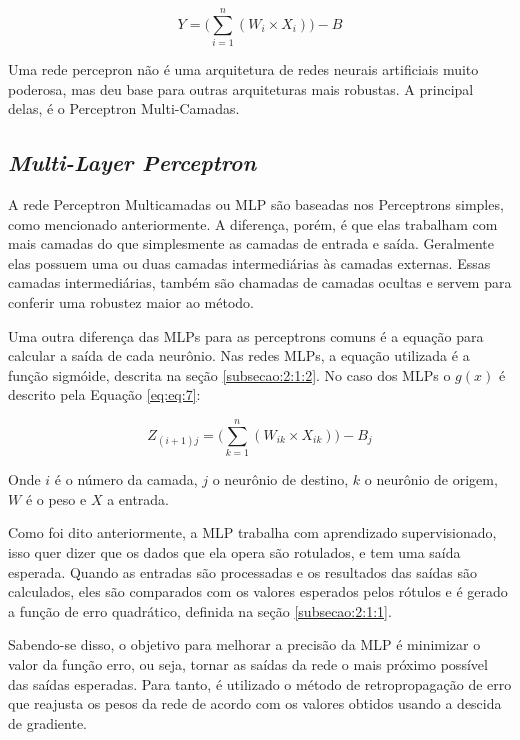 \begin{equation}
Y=\Big(\sum_{i=1}^{n}{(W_i \times X_i)}\Big) - B
\label{eq:eq5}
\end{equation}

Uma rede percepron não é uma arquitetura de redes neurais artificiais muito poderosa, mas deu base para outras arquiteturas mais robustas. A principal delas, é o Perceptron Multi-Camadas.

\subsection{\textit{Multi-Layer Perceptron}}
\label{subsecao:2:2:2}


A rede Perceptron Multicamadas ou \ac{MLP} são baseadas nos Perceptrons simples, como mencionado anteriormente. A diferença, porém, é que elas trabalham com mais camadas do que simplesmente as camadas de entrada e saída. Geralmente elas possuem uma ou duas camadas intermediárias às camadas externas. Essas camadas intermediárias, também são chamadas de camadas ocultas e servem para conferir uma robustez maior ao método.

Uma outra diferença das \ac{MLP}s para as perceptrons comuns é a equação para calcular a saída de cada neurônio. Nas redes \ac{MLP}s, a equação utilizada é a função sigmóide, descrita na seção \ref{subsecao:2:1:2}. No caso dos \ac{MLP}s o $g(x)$ é descrito pela Equação \ref{eq:eq:7}:

\begin{equation}
\label{eq:eq:7}
Z_{(i+1) j} = \Big(\sum_{k=1}^{n} (W_{i k}\times X_{i k})\Big)-B_j
\end{equation}

Onde $i$ é o número da camada, $j$ o neurônio de destino, $k$ o neurônio de origem, $W$ é o peso e $X$ a entrada.

Como foi dito anteriormente, a \ac{MLP} trabalha com aprendizado supervisionado, isso quer dizer que os dados que ela opera são rotulados, e tem uma saída esperada. Quando as entradas são processadas e os resultados das saídas são calculados, eles são comparados com os valores esperados pelos rótulos e é gerado a função de erro quadrático, definida na seção \ref{subsecao:2:1:1}.

Sabendo-se disso, o objetivo para melhorar a precisão da \ac{MLP} é minimizar o valor da função erro, ou seja, tornar as saídas da rede o mais próximo possível das saídas esperadas. Para tanto, é utilizado o método de retropropagação de erro que reajusta os pesos da rede de acordo com os valores obtidos usando a descida de gradiente.

